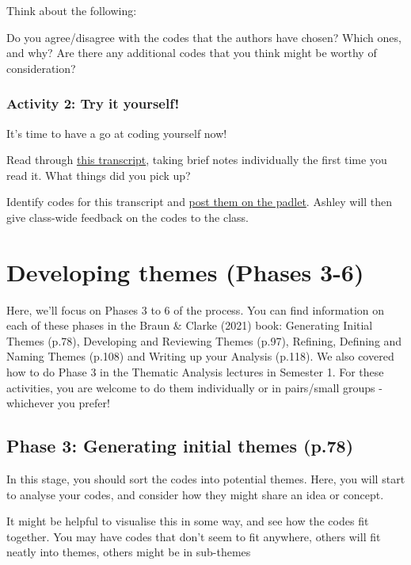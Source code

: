 \documentclass[
  english,
  letterpaper,
  DIV=11,
  numbers=noendperiod]{scrreprt}
\begin{document}
Think about the following:

Do you agree/disagree with the codes that the authors have chosen? Which
ones, and why? Are there any additional codes that you think might be
worthy of consideration?

\subsubsection{Activity 2: Try it
yourself!}\label{activity-2-try-it-yourself}

It's time to have a go at coding yourself now!

Read through
\href{https://gla-my.sharepoint.com/:w:/g/personal/ashley_robertson_glasgow_ac_uk/ERHhgbPHADBJuJHk7e2yMtYBb1ddJMCTckAvoXpXB0UYFA?e=UFwJqE}{this
transcript}, taking brief notes individually the first time you read it.
What things did you pick up?

Identify codes for this transcript and
\href{https://padlet.com/ashleyrobertson3/coding-activity-for-rm2-odl-76lzunt0l2p5x0ma}{post
them on the padlet}. Ashley will then give class-wide feedback on the
codes to the class.

\section{Developing themes (Phases
3-6)}\label{developing-themes-phases-3-6}

Here, we'll focus on Phases 3 to 6 of the process. You can find
information on each of these phases in the Braun \& Clarke (2021) book:
Generating Initial Themes (p.78), Developing and Reviewing Themes
(p.97), Refining, Defining and Naming Themes (p.108) and Writing up your
Analysis (p.118). We also covered how to do Phase 3 in the Thematic
Analysis lectures in Semester 1. For these activities, you are welcome
to do them individually or in pairs/small groups - whichever you prefer!

\subsection{Phase 3: Generating initial themes
(p.78)}\label{phase-3-generating-initial-themes-p.78}

In this stage, you should sort the codes into potential themes. Here,
you will start to analyse your codes, and consider how they might share
an idea or concept.

It might be helpful to visualise this in some way, and see how the codes
fit together. You may have codes that don't seem to fit anywhere, others
will fit neatly into themes, others might be in sub-themes
\end{document}
